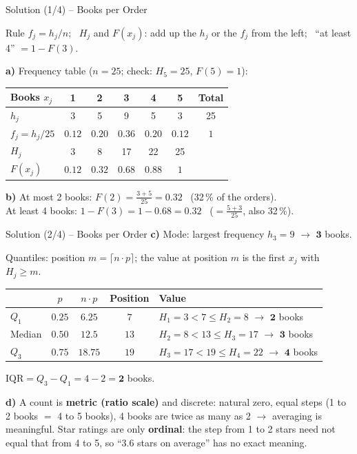 \documentclass[aspectratio=169,11pt]{beamer}
\begin{document}
\begin{frame}{Solution (1/4) -- Books per Order}
  \begin{block}{Rule}
    $f_j = h_j / n$; \ $H_j$ and $F(x_j)$: add up the $h_j$ or the $f_j$ from the left; \
    ``at least 4'' $= 1 - F(3)$.
  \end{block}
  \textbf{a)} Frequency table ($n = 25$; check: $H_5 = 25$, $F(5) = 1$):
  \begin{center}
    \renewcommand{\arraystretch}{1.2}
    \begin{tabular}{lcccccc}
      \toprule
      Books $x_j$ & 1 & 2 & 3 & 4 & 5 & Total \\
      \midrule
      $h_j$ & 3 & 5 & 9 & 5 & 3 & 25 \\
      $f_j = h_j / 25$ & $0.12$ & $0.20$ & $0.36$ & $0.20$ & $0.12$ & $1$ \\
      $H_j$ & 3 & 8 & 17 & 22 & 25 & \\
      $F(x_j)$ & $0.12$ & $\mathbf{0.32}$ & $0.68$ & $0.88$ & $1$ & \\
      \bottomrule
    \end{tabular}
  \end{center}
  \textbf{b)} At most 2 books: $F(2) = \frac{3 + 5}{25} = \mathbf{0.32}$ \ (32\,\% of the orders).\\[2pt]
  At least 4 books: $1 - F(3) = 1 - 0.68 = \mathbf{0.32}$ \ ($= \frac{5 + 3}{25}$, also 32\,\%).
\end{frame}

\begin{frame}{Solution (2/4) -- Books per Order}
  \textbf{c)} Mode: largest frequency $h_3 = 9$ $\to$ $\mathbf{3}$ books.

  \smallskip
  Quantiles: position $m = \lceil n \cdot p \rceil$; the value at position $m$ is the first $x_j$ with
  $H_j \geq m$.
  \begin{center}
    \renewcommand{\arraystretch}{1.15}
    \begin{tabular}{lcccl}
      \toprule
      & $p$ & $n \cdot p$ & Position & Value \\
      \midrule
      $Q_1$ & $0.25$ & $6.25$ & $7$ & $H_1 = 3 < 7 \leq H_2 = 8$ $\to$ $\mathbf{2}$ books \\
      Median & $0.50$ & $12.5$ & $13$ & $H_2 = 8 < 13 \leq H_3 = 17$ $\to$ $\mathbf{3}$ books \\
      $Q_3$ & $0.75$ & $18.75$ & $19$ & $H_3 = 17 < 19 \leq H_4 = 22$ $\to$ $\mathbf{4}$ books \\
      \bottomrule
    \end{tabular}
  \end{center}
  $\text{IQR} = Q_3 - Q_1 = 4 - 2 = \mathbf{2}$ books.

  \medskip
  \textbf{d)} A count is \textbf{metric (ratio scale)} and discrete: natural zero, equal steps
  (1 to 2 books $=$ 4 to 5 books), 4 books are twice as many as 2 $\to$ averaging is meaningful.
  Star ratings are only \textbf{ordinal}: the step from 1 to 2 stars need not equal that from 4 to 5,
  so ``3.6 stars on average'' has no exact meaning.
\end{frame}
\end{document}
